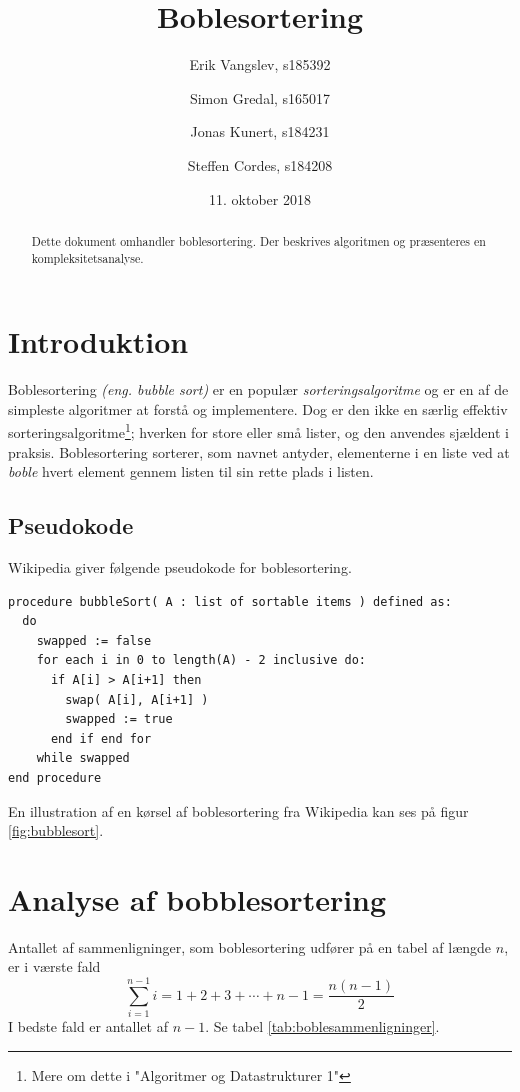 \documentclass[a4paper]{article}
\begin{document}
\title{Boblesortering}
\author{
   Erik Vangslev, s185392
   \and
   Simon Gredal, s165017
   \and
   Jonas Kunert, s184231
   \and
   Steffen Cordes, s184208}
\date{11. oktober 2018}
\maketitle

\begin{abstract}
Dette dokument omhandler boblesortering. Der beskrives algoritmen og præsenteres en kompleksitetsanalyse.
\end{abstract}

\section{Introduktion}
Boblesortering \textit{(eng. bubble sort)} er en populær \textit{sorteringsalgoritme} og er en af de simpleste algoritmer at forstå og implementere. Dog er den ikke en særlig effektiv sorteringsalgoritme\footnote{Mere om dette i "Algoritmer og Datastrukturer 1"}; hverken for store eller små lister, og den anvendes sjældent i praksis. Boblesortering sorterer, som navnet antyder, elementerne i en liste ved at \textit{boble} hvert element gennem listen til sin rette plads i listen.

\subsection{Pseudokode}
Wikipedia \cite{WikiBubble} giver følgende pseudokode for boblesortering.

\begin{verbatim}
procedure bubbleSort( A : list of sortable items ) defined as:
  do
    swapped := false
    for each i in 0 to length(A) - 2 inclusive do:
      if A[i] > A[i+1] then
        swap( A[i], A[i+1] )
        swapped := true
      end if end for
    while swapped
end procedure
\end{verbatim}
En illustration af en kørsel af boblesortering fra Wikipedia kan ses på figur \ref{fig:bubblesort}.

\section{Analyse af bobblesortering}
Antallet af sammenligninger, som boblesortering udfører på en tabel af længde \(n\),
er i værste fald
\[ 
\displaystyle\sum_{i=1}^{n-1} i = 1 + 2 + 3 + \cdots + n - 1 = \frac{n(n - 1)}{2}
\]
I bedste fald er antallet af \(n-1\). Se tabel \ref{tab:boblesammenligninger}.
\end{document}
